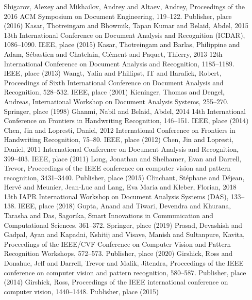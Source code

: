 \begin{thebibliography}{}
Shigarov, Alexey and Mikhailov, Andrey and Altaev, Andrey, Proceedings of the 2016 ACM Symposium on Document Engineering, 119--122. Publisher, place (2016)
Kasar, Thotreingam and Bhowmik, Tapan Kumar and Belaid, Abdel, 2015 13th International Conference on Document Analysis and Recognition (ICDAR), 1086--1090. IEEE, place (2015)
Kasar, Thotreingam and Barlas, Philippine and Adam, S{\'e}bastien and Chatelain, Cl{\'e}ment and Paquet, Thierry, 2013 12th International Conference on Document Analysis and Recognition, 1185--1189. IEEE, place (2013)
Wangt, Yalin and Phillipst, IT and Haralick, Robert, Proceedings of Sixth International Conference on Document Analysis and Recognition, 528--532. IEEE, place (2001)
Kieninger, Thomas and Dengel, Andreas, International Workshop on Document Analysis Systems, 255--270. Springer, place (1998)
Ghanmi, Nabil and Belaid, Abdel, 2014 14th International Conference on Frontiers in Handwriting Recognition, 146--151. IEEE, place (2014)
Chen, Jin and Lopresti, Daniel, 2012 International Conference on Frontiers in Handwriting Recognition, 75--80. IEEE, place (2012)
Chen, Jin and Lopresti, Daniel, 2011 International Conference on Document Analysis and Recognition, 399--403. IEEE, place (2011)
Long, Jonathan and Shelhamer, Evan and Darrell, Trevor, Proceedings of the IEEE conference on computer vision and pattern recognition, 3431--3440. Publisher, place (2015)
Clinchant, St{\'e}phane and D{\'e}jean, Herv{\'e} and Meunier, Jean-Luc and Lang, Eva Maria and Kleber, Florian, 2018 13th IAPR International Workshop on Document Analysis Systems (DAS), 133--138. IEEE, place (2018)
Gupta, Anand and Tiwari, Devendra and Khurana, Tarasha and Das, Sagorika, Smart Innovations in Communication and Computational Sciences, 361--372. Springer, place (2019)
Prasad, Devashish and Gadpal, Ayan and Kapadni, Kshitij and Visave, Manish and Sultanpure, Kavita, Proceedings of the IEEE/CVF Conference on Computer Vision and Pattern Recognition Workshops, 572--573. Publisher, place (2020)
Girshick, Ross and Donahue, Jeff and Darrell, Trevor and Malik, Jitendra, Proceedings of the IEEE conference on computer vision and pattern recognition, 580--587. Publisher, place (2014)
Girshick, Ross, Proceedings of the IEEE international conference on computer vision, 1440--1448. Publisher, place (2015)

\end{thebibliography}

